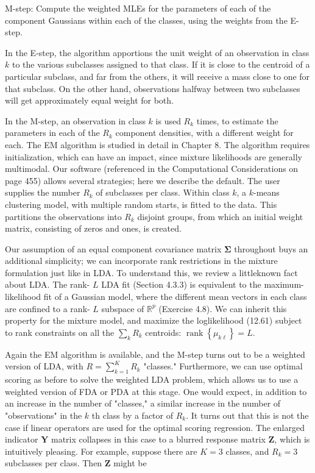 \documentclass[10pt]{article}
\begin{document}
M-step: Compute the weighted MLEs for the parameters of each of the component Gaussians within each of the classes, using the weights from the E-step.

In the E-step, the algorithm apportions the unit weight of an observation in class $k$ to the various subclasses assigned to that class. If it is close to the centroid of a particular subclass, and far from the others, it will receive a mass close to one for that subclass. On the other hand, observations halfway between two subclasses will get approximately equal weight for both.

In the M-step, an observation in class $k$ is used $R_{k}$ times, to estimate the parameters in each of the $R_{k}$ component densities, with a different weight for each. The EM algorithm is studied in detail in Chapter 8. The algorithm requires initialization, which can have an impact, since mixture likelihoods are generally multimodal. Our software (referenced in the Computational Considerations on page 455) allows several strategies; here we describe the default. The user supplies the number $R_{k}$ of subclasses per class. Within class $k$, a $k$-means clustering model, with multiple random starts, is fitted to the data. This partitions the observations into $R_{k}$ disjoint groups, from which an initial weight matrix, consisting of zeros and ones, is created.

Our assumption of an equal component covariance matrix $\boldsymbol{\Sigma}$ throughout buys an additional simplicity; we can incorporate rank restrictions in the mixture formulation just like in LDA. To understand this, we review a littleknown fact about LDA. The rank- $L$ LDA fit (Section 4.3.3) is equivalent to the maximum-likelihood fit of a Gaussian model, where the different mean vectors in each class are confined to a rank- $L$ subspace of $\mathbb{R}^{p}$ (Exercise 4.8). We can inherit this property for the mixture model, and maximize the loglikelihood (12.61) subject to rank constraints on all the $\sum_{k} R_{k}$ centroids: $\operatorname{rank}\left\{\mu_{k \ell}\right\}=L$.

Again the EM algorithm is available, and the M-step turns out to be a weighted version of LDA, with $R=\sum_{k=1}^{K} R_{k}$ "classes." Furthermore, we can use optimal scoring as before to solve the weighted LDA problem, which allows us to use a weighted version of FDA or PDA at this stage. One would expect, in addition to an increase in the number of "classes," a similar increase in the number of "observations" in the $k$ th class by a factor of $R_{k}$. It turns out that this is not the case if linear operators are used for the optimal scoring regression. The enlarged indicator $\mathbf{Y}$ matrix collapses in this case to a blurred response matrix $\mathbf{Z}$, which is intuitively pleasing. For example, suppose there are $K=3$ classes, and $R_{k}=3$ subclasses per class. Then $\mathbf{Z}$ might be
\end{document}
